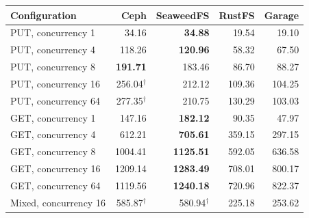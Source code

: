 \begin{tabular}{lrrrr}
\toprule
Configuration & Ceph & SeaweedFS & RustFS & Garage \\
\midrule
PUT, concurrency 1 & 34.16 & \textbf{34.88} & 19.54 & 19.10 \\
PUT, concurrency 4 & 118.26 & \textbf{120.96} & 58.32 & 67.50 \\
PUT, concurrency 8 & \textbf{191.71} & 183.46 & 86.70 & 88.27 \\
PUT, concurrency 16 & 256.04$^{\dagger}$ & 212.12 & 109.36 & 104.25 \\
PUT, concurrency 64 & 277.35$^{\dagger}$ & 210.75 & 130.29 & 103.03 \\
\midrule
GET, concurrency 1 & 147.16 & \textbf{182.12} & 90.35 & 47.97 \\
GET, concurrency 4 & 612.21 & \textbf{705.61} & 359.15 & 297.15 \\
GET, concurrency 8 & 1004.41 & \textbf{1125.51} & 592.05 & 636.58 \\
GET, concurrency 16 & 1209.14 & \textbf{1283.49} & 708.01 & 800.17 \\
GET, concurrency 64 & 1119.56 & \textbf{1240.18} & 720.96 & 822.37 \\
\midrule
Mixed, concurrency 16 & 585.87$^{\dagger}$ & 580.94$^{\dagger}$ & 225.18 & 253.62 \\
\bottomrule
\end{tabular}
